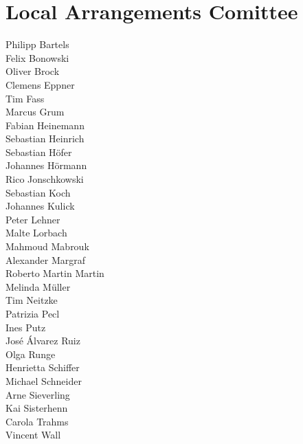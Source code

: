\vspace{2cm}

\section{Local Arrangements Comittee}
\hspace{0.14\textwidth}

\begin{multicols}{4}

{
\noindent
Philipp	Bartels\\
Felix 	Bonowski\\
Oliver	Brock\\
Clemens	Eppner\\
Tim	Fass\\
Marcus	Grum\\
Fabian	Heinemann\\
Sebastian	Heinrich\\
Sebastian	Höfer\\
Johannes	Hörmann\\
Rico	Jonschkowski\\
Sebastian	Koch\\
Johannes	Kulick\\
Peter	Lehner\\
Malte	Lorbach\\
Mahmoud	Mabrouk\\
Alexander	Margraf\\
Roberto	Martin Martin\\
Melinda	Müller\\
Tim	Neitzke\\
Patrizia	Pecl\\
Ines	Putz\\
Jos\'e	\'Alvarez Ruiz\\
Olga	Runge\\
Henrietta	Schiffer\\
Michael	Schneider\\
Arne	Sieverling\\
Kai	Sisterhenn\\
Carola	Trahms\\
Vincent	Wall\\
}
\end{multicols}
\vfill

